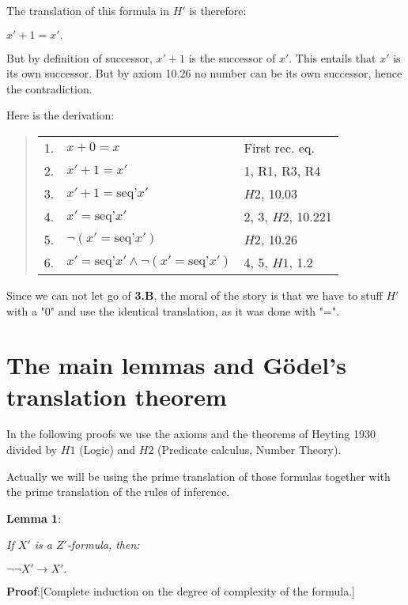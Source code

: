 \documentclass[12pt]{article}
\begin{document}
\begin{enumerate}
The translation of this formula in $H'$ is therefore:

\begin{center} 
$x' + 1 = x'.$ 
\end{center}

But by definition of successor, $x' + 1$ is the successor of $x'$. This entails that $x'$ is its own successor. But by axiom 10.26 no number can be its own successor, hence the contradiction. 

Here is the derivation:

\begin{quote}
\begin{tabular}{lll}
1.&$x + 0 = x$&First rec. eq.\\
2.&$x' + 1 = x'$&1, R1, R3, R4\\
3.&$x' + 1 =\text{seq'} x'$&$H2$, 10.03\\
4.&$x' =\text{seq'} x'$&2, 3, $H2$, 10.221\\
5.&$\neg (x' =\text{seq'} x')$&$H2$, 10.26\\
6.&$x' =\text{seq'} x' \wedge \neg (x' =\text{seq'} x')$&4, 5, $H1$, 1.2
\end{tabular}
\end{quote}     

Since we can not let go of \textbf{3.B}, the moral of the story is that we have to stuff $H'$ with a "0" and use the identical translation, as it was done with "=".

\end{enumerate}

\section{The main lemmas and G\"{o}del's translation theorem}\normalsize

In the following proofs we use the axioms and the theorems of Heyting 1930 divided by $H1$ (Logic) and $H2$ (Predicate calculus, Number Theory).

Actually we will be using the prime translation of those formulas together with the prime translation of the rules of inference.

\medskip
\textbf{Lemma 1}:

\begin{center}
\emph{If $X'$ is a $Z'$-formula, then:}

$\neg \neg X' \rightarrow X'.$
\end{center}

\medskip
\textbf{Proof}:[Complete induction on the degree of complexity of the formula.]
\end{document}
